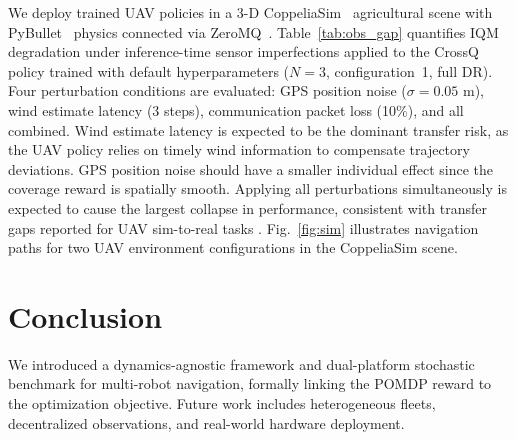 \documentclass{article}
\begin{document}
We deploy trained UAV policies in a 3-D CoppeliaSim~\citep{coppeliaSim2013} agricultural scene with PyBullet~\citep{coumans2021pybullet} physics connected via ZeroMQ~\citep{ZeroMQ}. Table~\ref{tab:obs_gap} quantifies IQM degradation under inference-time sensor imperfections applied to the CrossQ policy trained with default hyperparameters ($N = 3$, configuration~1, full DR). Four perturbation conditions are evaluated: GPS position noise ($\sigma = 0.05$ m), wind estimate latency (3 steps), communication packet loss (10\%), and all combined. Wind estimate latency is expected to be the dominant transfer risk, as the UAV policy relies on timely wind information to compensate trajectory deviations. GPS position noise should have a smaller individual effect since the coverage reward is spatially smooth. Applying all perturbations simultaneously is expected to cause the largest collapse in performance, consistent with transfer gaps reported for UAV sim-to-real tasks \citep{peng2018sim2real, akkaya2019solving}. Fig.~\ref{fig:sim} illustrates navigation paths for two UAV environment configurations in the CoppeliaSim scene.


\section{Conclusion}
\label{sec:con}

We introduced a dynamics-agnostic framework and dual-platform stochastic benchmark for multi-robot navigation, formally linking the POMDP reward to the optimization objective. Future work includes heterogeneous fleets, decentralized observations, and real-world hardware deployment.
\end{document}
